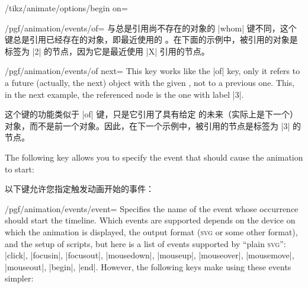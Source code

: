 \begin{key}{/tikz/animate/options/begin on=}
\begin{key}{/pgf/animation/events/of=}
        与总是引用尚不存在的对象的 |whom| 键不同，这个键总是引用已经存在的对象，即最近使用的 。在下面的示例中，被引用的对象是标签为 |2| 的节点，因为它是最近使用  |X| 引用的节点。


\begin{codeexample}[width=3cm,preamble={\usetikzlibrary{animations}}]
\end{codeexample}
    \end{key}

    \begin{key}{/pgf/animation/events/of next=}
        This key works like the |of| key, only it refers to a future (actually,
        the next) object with the given , not to a previous one. This,
        in the next example, the referenced node is the one with label |3|.
        
        这个键的功能类似于 |of| 键，只是它引用了具有给定  的未来（实际上是下一个）对象，而不是前一个对象。因此，在下一个示例中，被引用的节点是标签为 |3| 的节点。
\begin{codeexample}[width=3cm,preamble={\usetikzlibrary{animations}}]
\end{codeexample}
    \end{key}

    The following key allows you to specify the event that should cause the
    animation to start:
    
    以下键允许您指定触发动画开始的事件：


    \begin{key}{/pgf/animation/events/event=}
        Specifies the name of the event whose occurrence should start the
        timeline. Which events are supported depends on the device on which the
        animation is displayed, the output format (\textsc{svg} or some other
        format), and the setup of scripts, but here is a list of events
        supported by ``plain \textsc{svg}'': |click|, |focusin|, |focusout|,
        |mousedown|,  |mouseup|, |mouseover|, |mousemove|, |mouseout|, |begin|,
        |end|. However, the following keys make using these events simpler:
        

\end{key}
\end{key}
